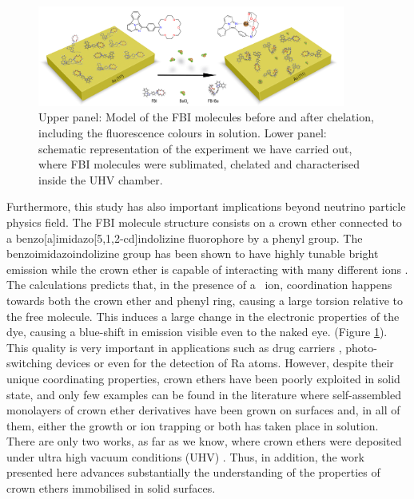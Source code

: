 \documentclass[aps,prl,reprint,longbibliography,superscriptaddress, english]{revtex4-1}
\begin{document}
 \begin{figure}[ht!]
	\includegraphics[width=0.9\textwidth]{figures/figura_1a.jpg}
	\caption{\label{ModeloFBI} 
    Upper panel: Model of the FBI molecules before and after chelation, including the fluorescence colours in solution. Lower panel: schematic representation of the experiment we have carried out, where FBI molecules were sublimated, chelated and characterised inside the UHV chamber.}
\end{figure}  

Furthermore, this study has also important implications beyond neutrino particle physics field. The FBI molecule structure consists on a crown ether connected to a benzo[a]imidazo[5,1,2-cd]indolizine fluorophore by a phenyl group. The benzoimidazoindolizine group has been shown to have highly tunable bright emission\cite{Stasyuk_benzo,Levesque_general} while the crown ether is capable of interacting with many different ions \cite{valeur_chemical,maleknia_cavity-size-dependent_2002}. The calculations predicts that, in the presence of a \Bapp\ ion, coordination happens towards both the crown ether and phenyl ring, causing a large torsion relative to the free molecule. This induces a large change in the electronic properties of the dye, causing a blue-shift in emission visible even to the naked eye. (Figure \ref{ModeloFBI}).  
This quality is very important in applications such as drug carriers \cite{uchegbu_non-ionic_1998}, photo-switching devices \cite{malval_photoswitching_2002,uda_membrane_2005} or even for the detection of Ra atoms. However, despite their unique coordinating properties\cite{more_intrinsic_1999,dobler1981ionophores,maleknia_cavity-size-dependent_2002}, crown ethers have been poorly exploited in solid state, and only few examples can be found in the literature where self-assembled monolayers of crown ether derivatives have been grown on surfaces\cite{yoshimoto_hostguest_2003,flink_recognition_1999,inokuchi_new_2015}  and, in all of them, either the growth or ion trapping or both has taken place in solution. 
 There are only two works, as far as we know, where crown ethers were deposited under ultra high vacuum conditions (UHV) \cite{feng_growth_2018,stredansky_-surface_2019}. 
Thus, in addition, the work presented here advances substantially the understanding of the properties of crown ethers immobilised in solid surfaces.
\end{document}
